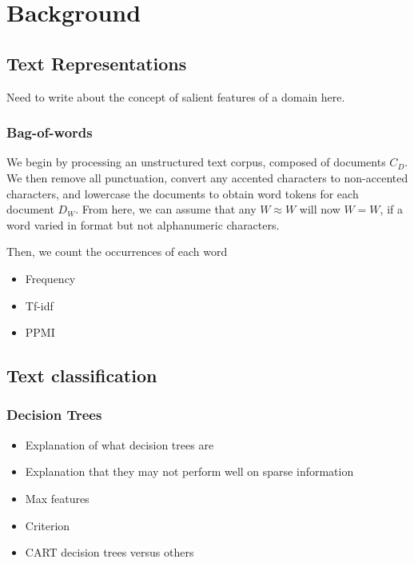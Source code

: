 \chapter{Background}
\section{Text Representations}
Need to write about the concept of salient features of a domain here.
\subsection{Bag-of-words}\label{background:BOW}
We begin by processing an unstructured text corpus, composed of documents $C_D$. We then remove all punctuation, convert any accented characters to non-accented characters, and lowercase the documents to obtain word tokens for each document $D_W$. From here, we can assume that any $W \approx W$ will now $W = W$, if a word varied in format but not alphanumeric characters. 

Then, we count the occurrences of each word
\begin{itemize}
	\item Frequency
	\item Tf-idf
	\item PPMI \label{bg:ppmi}
\end{itemize}
\section{Text classification}
\subsection{Decision Trees}\label{bg:trees}
\begin{itemize}
	\item Explanation of what decision trees are
	\item Explanation that they may not perform well on sparse information
	\item Max features
	\item Criterion
	\item CART decision trees versus others
\end{itemize}

